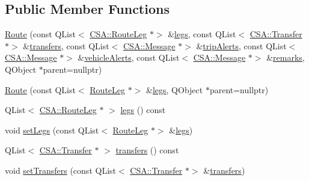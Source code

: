 \subsection*{Public Member Functions}
\begin{DoxyCompactItemize}
\item 
\mbox{\hyperlink{classCSA_1_1Route_a285d58821dfce5fe134c928cfb72e56e}{Route}} (const Q\+List$<$ \mbox{\hyperlink{classCSA_1_1RouteLeg}{C\+S\+A\+::\+Route\+Leg}} $\ast$$>$ \&\mbox{\hyperlink{classCSA_1_1Route_aad3e30f3e22b3a1b9d800441ce6ca1d4}{legs}}, const Q\+List$<$ \mbox{\hyperlink{classCSA_1_1Transfer}{C\+S\+A\+::\+Transfer}} $\ast$$>$ \&\mbox{\hyperlink{classCSA_1_1Route_a4a476195f30a740680bd3b61df7a5540}{transfers}}, const Q\+List$<$ \mbox{\hyperlink{classCSA_1_1Message}{C\+S\+A\+::\+Message}} $\ast$$>$ \&\mbox{\hyperlink{classCSA_1_1Route_a6e5c03d04237cea4167239b201f2d40b}{trip\+Alerts}}, const Q\+List$<$ \mbox{\hyperlink{classCSA_1_1Message}{C\+S\+A\+::\+Message}} $\ast$$>$ \&\mbox{\hyperlink{classCSA_1_1Route_a173ce470308b9f20ae2273d987c6041f}{vehicle\+Alerts}}, const Q\+List$<$ \mbox{\hyperlink{classCSA_1_1Message}{C\+S\+A\+::\+Message}} $\ast$$>$ \&\mbox{\hyperlink{classCSA_1_1Route_a6f5f7a812156030f15b7e94b2e43a72a}{remarks}}, Q\+Object $\ast$parent=nullptr)
\item 
\mbox{\hyperlink{classCSA_1_1Route_a9c40376e7b67c123f88b9afba8aad6d6}{Route}} (const Q\+List$<$ \mbox{\hyperlink{classCSA_1_1RouteLeg}{Route\+Leg}} $\ast$$>$ \&\mbox{\hyperlink{classCSA_1_1Route_aad3e30f3e22b3a1b9d800441ce6ca1d4}{legs}}, Q\+Object $\ast$parent=nullptr)
\item 
Q\+List$<$ \mbox{\hyperlink{classCSA_1_1RouteLeg}{C\+S\+A\+::\+Route\+Leg}} $\ast$ $>$ \mbox{\hyperlink{classCSA_1_1Route_aad3e30f3e22b3a1b9d800441ce6ca1d4}{legs}} () const
\item 
void \mbox{\hyperlink{classCSA_1_1Route_acae4554ffa830193e2edbd8936842551}{set\+Legs}} (const Q\+List$<$ \mbox{\hyperlink{classCSA_1_1RouteLeg}{Route\+Leg}} $\ast$$>$ \&\mbox{\hyperlink{classCSA_1_1Route_aad3e30f3e22b3a1b9d800441ce6ca1d4}{legs}})
\item 
Q\+List$<$ \mbox{\hyperlink{classCSA_1_1Transfer}{C\+S\+A\+::\+Transfer}} $\ast$ $>$ \mbox{\hyperlink{classCSA_1_1Route_a4a476195f30a740680bd3b61df7a5540}{transfers}} () const
\item 
void \mbox{\hyperlink{classCSA_1_1Route_a0977183a554295d3aaabdd3e3aa68ab4}{set\+Transfers}} (const Q\+List$<$ \mbox{\hyperlink{classCSA_1_1Transfer}{C\+S\+A\+::\+Transfer}} $\ast$$>$ \&\mbox{\hyperlink{classCSA_1_1Route_a4a476195f30a740680bd3b61df7a5540}{transfers}})

\end{DoxyCompactItemize}
